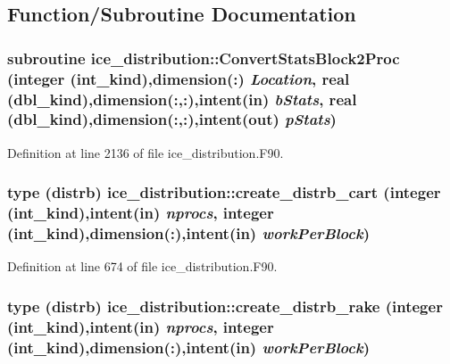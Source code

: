 \subsection{Function/Subroutine Documentation}
\hypertarget{namespaceice__distribution_a672be5ed19afd4bc4b99de14c174471e}{
\subsubsection[{ConvertStatsBlock2Proc}]{\setlength{\rightskip}{0pt plus 5cm}subroutine ice\_\-distribution::ConvertStatsBlock2Proc (integer (int\_\-kind),dimension(:) {\em Location}, \/  real (dbl\_\-kind),dimension(:,:),intent(in) {\em bStats}, \/  real (dbl\_\-kind),dimension(:,:),intent(out) {\em pStats})}}
\label{namespaceice__distribution_a672be5ed19afd4bc4b99de14c174471e}


Definition at line 2136 of file ice\_\-distribution.F90.\hypertarget{namespaceice__distribution_a879fa1e845de0c882360a4e48c1ff50d}{
\subsubsection[{create\_\-distrb\_\-cart}]{\setlength{\rightskip}{0pt plus 5cm}type ({\bf distrb}) ice\_\-distribution::create\_\-distrb\_\-cart (integer (int\_\-kind),intent(in) {\em nprocs}, \/  integer (int\_\-kind),dimension(:),intent(in) {\em workPerBlock})}}
\label{namespaceice__distribution_a879fa1e845de0c882360a4e48c1ff50d}


Definition at line 674 of file ice\_\-distribution.F90.\hypertarget{namespaceice__distribution_aa5edcd4e7149b4d79d4b503b37607e9a}{
\subsubsection[{create\_\-distrb\_\-rake}]{\setlength{\rightskip}{0pt plus 5cm}type ({\bf distrb}) ice\_\-distribution::create\_\-distrb\_\-rake (integer (int\_\-kind),intent(in) {\em nprocs}, \/  integer (int\_\-kind),dimension(:),intent(in) {\em workPerBlock})}}
\label{namespaceice__distribution_aa5edcd4e7149b4d79d4b503b37607e9a}


